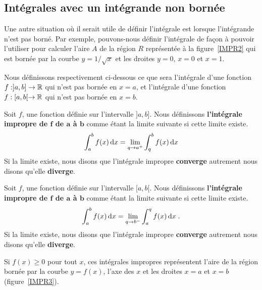{\subsection{Intégrales avec un intégrande non bornée}

Une autre situation où il serait utile de définir l'intégrale est
lorsque l'intégrande n'est pas borné.  Par exemple, pouvons-nous définir
l'intégrale de façon à pouvoir l'utiliser pour calculer l'aire $A$ de
la région $R$ représentée à la figure~\ref{IMPR2} qui est bornée par la courbe
$y=1/\sqrt{x}$ et les droites $y=0$, $x=0$ et $x=1$.


Nous définissons respectivement ci-dessous ce que sera l'intégrale d'une
fonction $f:]a,b]\to \mathbb{R}$ qui n'est pas bornée en $x=a$, et
l'intégrale d'une fonction $f:[a,b[\to \mathbb{R}$ qui n'est pas bornée en
$x=b$.

\begin{focus}{\dfn} 
Soit $f$, une fonction définie sur l'intervalle $]a, b]$. Nous définissons
{\bfseries l'intégrale impropre de $\mathbf f$ de $\mathbf a$ à
$\mathbf b$} comme étant la limite suivante si cette limite existe.
\[
\int_a^b f(x) \,\mathrm{d}x
= \lim_{q\rightarrow a^+} \int_q^b f(x)\,\mathrm{d}x
\]
Si la limite existe, nous disons que l'intégrale impropre
{\bfseries converge} autrement nous disons qu'elle {\bfseries diverge}.

Soit $f$, une fonction définie sur l'intervalle $[a, b[$.  Nous définissons
{\bfseries l'intégrale impropre de $\mathbf f$ de $\mathbf a$ à
$\mathbf b$} comme étant la limite suivante si cette limite existe.
\[
\int_a^b f(x) \,\mathrm{d}x
= \lim_{q\rightarrow b^-} \int_a^q f(x)\,\mathrm{d}x \; .
\]
Si la limite existe, nous disons que l'intégrale impropre
{\bfseries converge} autrement nous disons qu'elle {\bfseries diverge}.
\end{focus}

Si $f(x)\geq 0$ pour tout $x$, ces intégrales impropres représentent
l'aire de la région bornée par la courbe $y=f(x)$, l'axe des $x$ et
les droites $x=a$ et $x=b$ (figure~\ref{IMPR3}).


}
